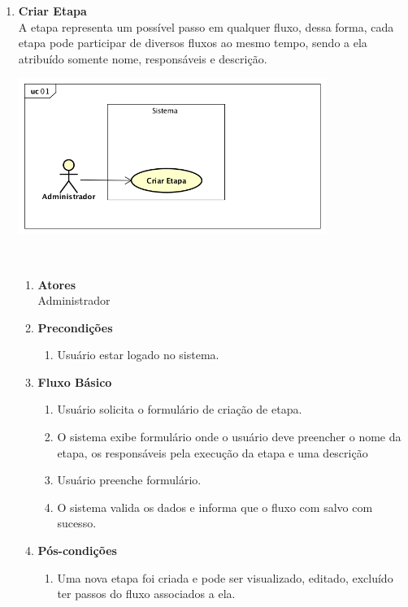 \begin{enumerate}[label=\textbf{UC01}, leftmargin=2cm]
	\item \textbf{Criar Etapa} \\
	A etapa representa um possível passo em qualquer fluxo, dessa forma, cada etapa pode participar de diversos fluxos ao mesmo tempo, sendo a ela atribuído somente nome, responsáveis e descrição. \\
	\begin{minipage}[c]{10cm}
	    \includegraphics[width=10cm]{Imagens/UC_CriarEtapa.png}
		\label{fig:uc_criar_fluxo}
	\end{minipage} \\

	\begin{enumerate}[label=, leftmargin=0cm]
		\item \textbf{Atores} \\
		Administrador
		\item \textbf{Precondições}
			\begin{enumerate}[label=\arabic*.]
				\item Usuário estar logado no sistema.
			\end{enumerate}
		\item \textbf{Fluxo Básico}
			\begin{enumerate}[label=\arabic*.]
				\item Usuário solicita o formulário de criação de etapa.
				\item O sistema exibe formulário onde o usuário deve preencher o nome da etapa, os responsáveis pela execução da etapa e uma descrição
				\item Usuário preenche formulário.
				\item O sistema valida os dados e informa que o fluxo com salvo com sucesso.
			\end{enumerate}
		\item \textbf{Pós-condições}
			\begin{enumerate}[label=\arabic*.]
				\item Uma nova etapa foi criada e pode ser visualizado, editado, excluído ter passos do fluxo associados a ela.
			\end{enumerate}
	\end{enumerate}
	 
\end{enumerate}


